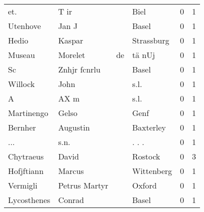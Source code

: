 \begin{center}
\begin{tiny}
\begin{longtabu}{llllrr}
                      et. &                               T ir &             &                                        Biel &          0 &         1 \\
                 Utenhove &                              Jan J &             &                                       Basel &          0 &         1 \\
                    Hedio &                             Kaspar &             &                                  Strassburg &          0 &         1 \\
                   Museau &                            Morelet &          de &                                      tä nUj &          0 &         1 \\
                       Sc &                       Znhjr fcnrlu &             &                                       Basel &          0 &         1 \\
                  Willock &                               John &             &                                        s.l. &          0 &         1 \\
                        A &                               AX m &             &                                        s.l. &          0 &         1 \\
               Martinengo &                              Gelso &             &                                        Genf &          0 &         1 \\
                  Bernher &                           Augustin &             &                                   Baxterley &          0 &         1 \\
                      ... &                               s.n. &             &                                      . . .  &          0 &         1 \\
                Chytraeus &                              David &             &                                     Rostock &          0 &         3 \\
               Hofjftiann &                             Marcus &             &                                  Wittenberg &          0 &         1 \\
                 Vermigli &                      Petrus Martyr &             &                                      Oxford &          0 &         1 \\
              Lycosthenes &                             Conrad &             &                                       Basel &          0 &         1 \\

\end{longtabu}
\end{tiny}
\end{center}
